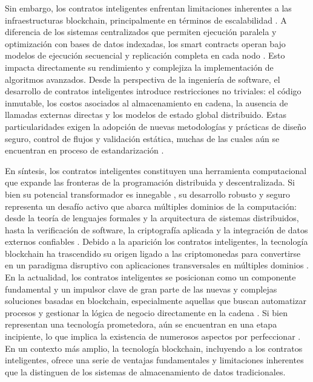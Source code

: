 Sin embargo, los contratos inteligentes enfrentan limitaciones inherentes a las infraestructuras blockchain, principalmente en términos de escalabilidad \cite{kalajdjieski2023databases}. A diferencia de los sistemas centralizados que permiten ejecución paralela y optimización con bases de datos indexadas, los smart contracts operan bajo modelos de ejecución secuencial y replicación completa en cada nodo \cite{taherdoost2023smart}. Esto impacta directamente su rendimiento y complejiza la implementación de algoritmos avanzados. Desde la perspectiva de la ingeniería de software, el desarrollo de contratos inteligentes introduce restricciones no triviales: el código inmutable, los costos asociados al almacenamiento en cadena, la ausencia de llamadas externas directas y los modelos de estado global distribuido. Estas particularidades exigen la adopción de nuevas metodologías y prácticas de diseño seguro, control de flujos y validación estática, muchas de las cuales aún se encuentran en proceso de estandarización \cite{taherdoost2023smart, cepal2021economia}.

En síntesis, los contratos inteligentes constituyen una herramienta computacional que expande las fronteras de la programación distribuida y descentralizada. Si bien su potencial transformador es innegable \cite{taherdoost2023smart}, su desarrollo robusto y seguro representa un desafío activo que abarca múltiples dominios de la computación: desde la teoría de lenguajes formales \cite{hoskinson2017we} y la arquitectura de sistemas distribuidos, hasta la verificación de software, la criptografía aplicada y la integración de datos externos confiables \cite{taherdoost2023smart}. Debido a la aparición los contratos inteligentes, la tecnología blockchain ha trascendido su origen ligado a las criptomonedas para convertirse en un paradigma disruptivo con aplicaciones transversales en múltiples dominios \cite{bartolomeo2020introduccion, vaigandla2023review}. En la actualidad, los contratos inteligentes se posicionan como un componente fundamental y un impulsor clave de gran parte de las nuevas y complejas soluciones basadas en blockchain, especialmente aquellas que buscan automatizar procesos y gestionar la lógica de negocio directamente en la cadena \cite{sharabati2024blockchain}. Si bien representan una tecnología prometedora, aún se encuentran en una etapa incipiente, lo que implica la existencia de numerosos aspectos por perfeccionar \cite{taherdoost2023smart}. En un contexto más amplio, la tecnología blockchain, incluyendo a los contratos inteligentes, ofrece una serie de ventajas fundamentales y limitaciones inherentes que la distinguen de los sistemas de almacenamiento de datos tradicionales.

